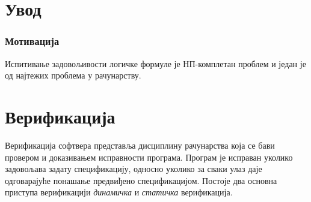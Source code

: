 \documentclass[12pt,oneside]{memoir}
\begin{document}
\frontmatter
\naslovna
\komisija
\apstrakt
\mainmatter
\tableofcontents





\chapter{Увод} 
\subsection{Мотивација}
Испитивање задовољивости логичке формуле је НП-комплетан проблем и један је од најтежих проблема у рачунарству.


\chapter{Верификација}
	Верификација софтвера представља дисциплину рачунарства која се бави провером и доказивањем исправности програма. Програм је исправан уколико задовољава задату спецификацију, односно уколико за сваки улаз даје одговарајуће понашање предвиђено спецификацијом. Постоје два основна приступа верификацији \emph{динамичка} и \emph{статичка} верификација.
\end{document}
